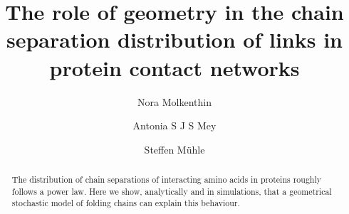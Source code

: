 \documentclass[reprint,amsmath,amssymb,rmp,onecolumn,notitlepage,11pt]{revtex4-1}
\begin{document}
\title{The role of geometry in the chain separation distribution of links in protein contact networks}
\author{Nora Molkenthin}
\author{Antonia S J S Mey}
\author{Steffen Mühle}


\begin{abstract}
The distribution of chain separations of interacting amino acids in proteins roughly follows a power law. Here we show, analytically and in simulations, that a geometrical stochastic model of folding chains can explain this behaviour. %
\end{abstract}
\maketitle
\end{document}
